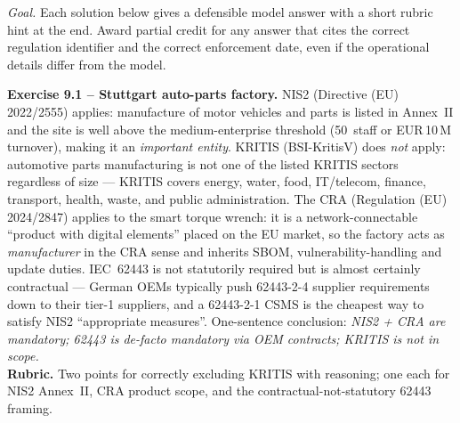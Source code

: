 \documentclass[11pt,a4paper]{article}
\begin{document}
\sheetheader

\noindent\emph{Goal.} Each solution below gives a defensible model answer with a short rubric hint at the end. Award partial credit for any answer that cites the correct regulation identifier and the correct enforcement date, even if the operational details differ from the model.

\begin{solutionbox}
\textbf{Exercise 9.1 -- Stuttgart auto-parts factory.}
NIS2 (Directive (EU) 2022/2555) applies: manufacture of motor vehicles and parts is listed in Annex~II and the site is well above the medium-enterprise threshold (50~staff or EUR\,10\,M turnover), making it an \emph{important entity}. KRITIS (BSI-KritisV) does \emph{not} apply: automotive parts manufacturing is not one of the listed KRITIS sectors regardless of size --- KRITIS covers energy, water, food, IT/telecom, finance, transport, health, waste, and public administration. The CRA (Regulation (EU) 2024/2847) applies to the smart torque wrench: it is a network-connectable ``product with digital elements'' placed on the EU market, so the factory acts as \emph{manufacturer} in the CRA sense and inherits SBOM, vulnerability-handling and update duties. IEC~62443 is not statutorily required but is almost certainly contractual --- German OEMs typically push 62443-2-4 supplier requirements down to their tier-1 suppliers, and a 62443-2-1 CSMS is the cheapest way to satisfy NIS2 ``appropriate measures''. One-sentence conclusion: \emph{NIS2 + CRA are mandatory; 62443 is de-facto mandatory via OEM contracts; KRITIS is not in scope.}
\\\textbf{Rubric.} Two points for correctly excluding KRITIS with reasoning; one each for NIS2 Annex~II, CRA product scope, and the contractual-not-statutory 62443 framing.
\end{solutionbox}
\end{document}
